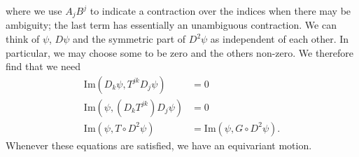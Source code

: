 \documentclass[11pt]{article}
\theoremstyle{remark}
\begin{document}
where we use $A_{\ensuremath{j}}B^{\ensuremath{j}}$ to indicate a contraction over the
indices when there may be ambiguity; the 
last term has essentially an unambiguous contraction. We can think
of $\ensuremath{\psi}$, $D\ensuremath{\psi}$ and the symmetric part of $D^2 \ensuremath{\psi}$ 
as  independent of each other. In particular, 
we may choose some to be zero and the others 
non-zero.
We therefore find that we need
\begin{subequations}
\begin{align}
\textrm{Im} \ensuremath{({D_{\ensuremath{k}}\ensuremath{\psi}}, {T^{\ensuremath{j} \ensuremath{k}} D_{\ensuremath{j}}\ensuremath{\psi}})}
 &= 0 \label{e:ce1}\\
\textrm{Im} \ensuremath{({\ensuremath{\psi}}, {(D_{\ensuremath{k}}T^{\ensuremath{j} \ensuremath{k}})  D_{\ensuremath{j}}\ensuremath{\psi}})}
 & = 0 \label{e:ce2}\\
\textrm{Im} \ensuremath{({\ensuremath{\psi}}, {T \circ D^2 \ensuremath{\psi}})}  &= \textrm{Im} \ensuremath{({\ensuremath{\psi}}, {G\circ D^2 \ensuremath{\psi}})}
\label{e:ce3} .
\end{align}
\end{subequations}
Whenever these equations are satisfied, we have an equivariant
motion. 
\end{document}
